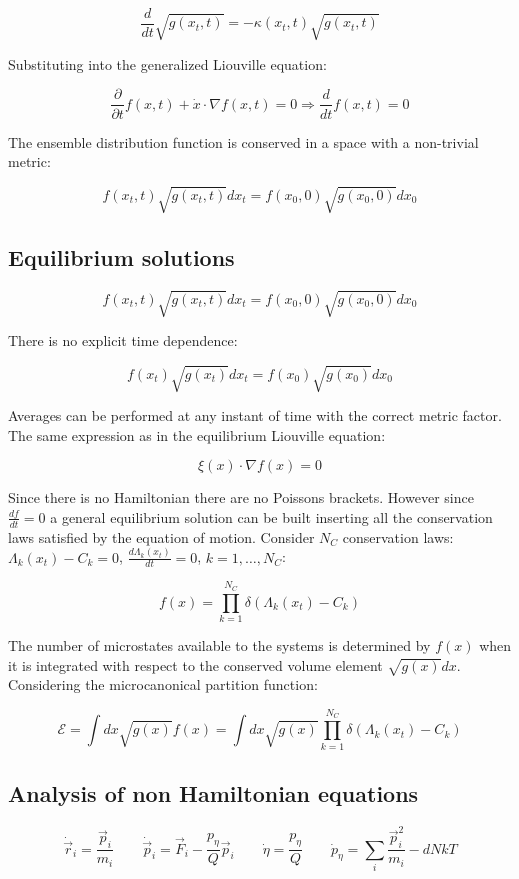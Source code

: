 	$$\frac{d}{dt}\sqrt{g(x_t, t)} = -\kappa(x_t, t) \sqrt{g(x_t,t)}$$

	Substituting into the generalized Liouville equation:

	$$\frac{\partial}{\partial t} f(x,t) + \dot{x}\cdot\nabla f(x,t) = 0\Rightarrow \frac{d}{dt}f(x,t) = 0$$

	The ensemble distribution function is conserved in a space with a non-trivial metric:

	$$f(x_t, t)\sqrt{g(x_t, t)}dx_t = f(x_0,0)\sqrt{g(x_0,0)}dx_0$$

	\subsection{Equilibrium solutions}

	$$f(x_t, t)\sqrt{g(x_t, t)}dx_t = f(x_0, 0)\sqrt{g(x_0,0)}dx_0$$

	There is no explicit time dependence:

	$$f(x_t)\sqrt{g(x_t)}dx_t = f(x_0)\sqrt{g(x_0)}dx_0$$

	Averages can be performed at any instant of time with the correct metric factor.
	The same expression as in the equilibrium Liouville equation:

	$$\xi(x)\cdot\nabla f(x) = 0$$

	Since there is no Hamiltonian there are no Poissons brackets.
	However since $\frac{df}{dt} = 0$ a general equilibrium solution can be built inserting all the conservation laws satisfied by the equation of motion.
	Consider $N_C$ conservation laws: $\Lambda_k(x_t)-C_k = 0$, $\frac{d\Lambda_k(x_t)}{dt} = 0$, $k = 1, \dots, N_C$:

	$$f(x) = \prod\limits_{k=1}^{N_C}\delta(\Lambda_k(x_t) - C_k)$$

	The number of microstates available to the systems is determined by $f(x)$ when it is integrated with respect to the conserved volume element $\sqrt{g(x)}dx$.
	Considering the microcanonical partition function:

	$$\mathcal{E} = \int dx\sqrt{g(x)}f(x) = \int dx\sqrt{g(x)}\prod\limits_{k=1}^{N_C}\delta(\Lambda_k(x_t) -C_k)$$

	\subsection{Analysis of non Hamiltonian equations}

	$$\dot{\vec{r}}_i = \frac{\vec{p}_i}{m_i}\qquad\dot{\vec{p}}_i = \vec{F}_i-\frac{p_\eta}{Q}\vec{p}_i\qquad\dot{\eta} = \frac{p_\eta}{Q}\qquad\dot{p}_\eta = \sum\limits_i\frac{\vec{p}_i^2}{m_i}-dNkT$$

